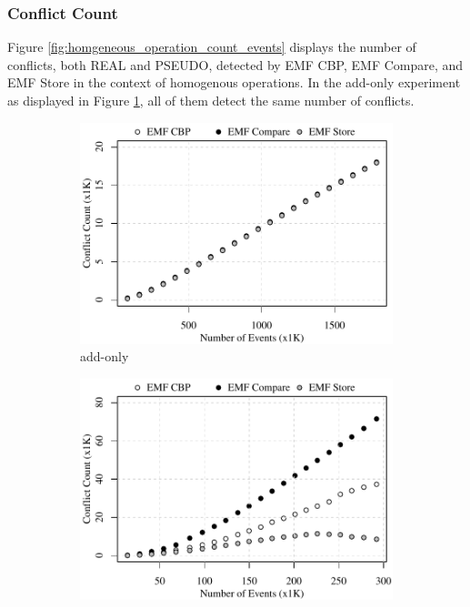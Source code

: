 \subsubsection{Conflict Count}
\label{sec:conflict_count}
Figure \ref{fig:homgeneous_operation_count_events} displays the number of conflicts, both \textsf{REAL} and \textsf{PSEUDO}, detected by EMF CBP, EMF Compare, and EMF Store in the context of homogenous operations. In the add-only experiment as displayed in Figure \ref{fig:add-conflict-count-events}, all of them detect the same number of conflicts.

\begin{figure}[ht]
\centering
\begin{subfigure}[t]{0.490\linewidth}
	\includegraphics[width=\linewidth]{add-conflict-count-events}
	\caption{add-only}
	\label{fig:add-conflict-count-events}
\end{subfigure}
\hfill
\begin{subfigure}[t]{0.490\linewidth}
	\includegraphics[width=\linewidth]{delete-conflict-count-events}

\end{subfigure}
\end{figure}
